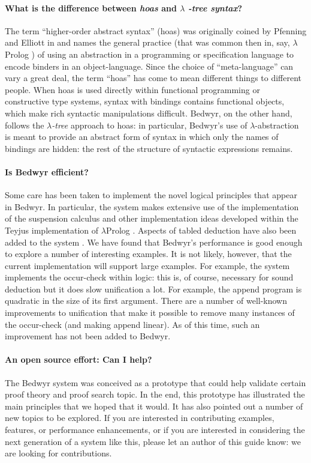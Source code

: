 \documentclass{article}
\newcommand{\lp}{$\lambda$Prolog}
\begin{document}
\paragraph{What is the difference between {\em hoas} and $\lambda${\em
    -tree syntax}?}
The term ``higher-order abstract syntax'' (hoas) was originally coined
by Pfenning and Elliott in \cite{pfenning88pldi} and names the general
practice (that was common then in, say, \lp{}
\cite{miller87slp}) of using an abstraction in a programming or
specification language to encode binders in an object-language.  Since
the choice of ``meta-language'' can vary a great deal, the term
``hoas'' has come to mean different things to different people.  When
hoas is used directly within functional programming or constructive
type systems, syntax with bindings contains functional objects, which
make rich syntactic manipulations difficult.  Bedwyr, on the other
hand, follows the {\em $\lambda$-tree} approach \cite{miller00cl} to
hoas: in particular, Bedwyr's use of $\lambda$-abstraction is meant to
provide an abstract form of syntax in which only the names of bindings
are hidden: the rest of the structure of syntactic expressions
remains.

\paragraph{Is Bedwyr efficient?}
Some care has been taken to implement the novel logical principles
that appear in Bedwyr.  In particular, the system makes extensive use
of the implementation of the suspension calculus \cite{nadathur99jflp}
and other implementation ideas developed within the Teyjus
\cite{nadathur99cade} implementation of \lp{} \cite{nadathur88iclp}.
Aspects of tabled deduction have also been added to the system
\cite{ramakrishna97cav,pientka05cade}.  We have found that Bedwyr's
performance is good enough to explore a number of interesting
examples.  It is not likely, however, that the current implementation
will support large examples.  For example, the system implements the
occur-check within logic: this is, of course, necessary for sound
deduction but it does slow unification a lot.  For example, the append
program is quadratic in the size of its first argument.  There are a
number of well-known improvements to unification that make it possible
to remove many instances of the occur-check (and making append
linear).  As of this time, such an improvement has not been added to
Bedwyr.

\paragraph{An open source effort: Can I help?}
The Bedwyr system was conceived as a prototype that could help
validate certain proof theory and proof search topic.  In the end,
this prototype has illustrated the main principles that we hoped that
it would.  It has also pointed out a number of new topics to be
explored.  If you are interested in contributing examples, features,
or performance enhancements, or if you are interested in considering
the next generation of a system like this, please let an author of
this guide know: we are looking for contributions.
\end{document}
